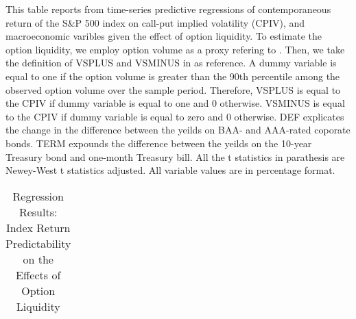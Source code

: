 \begin{table}[h]

\caption{Regression Results: Index Return Predictability on the Effects of Option Liquidity}\label{table:Volume}
\begin{threeparttable}

\medskip
\begin{spacing}{1.1}
{\scriptsize  
This table reports from time-series predictive regressions of contemporaneous return of the S\&P 500 index on call-put implied volatility (CPIV), and macroeconomic varibles given the effect of option liquidity. To estimate the option liquidity, we employ option volume as a proxy refering to \textcite{chang2018implied}. Then, we take the definition of VSPLUS and VSMINUS in \textcite{atilgan2015implied} as reference. A dummy variable is equal to one if the option volume is greater than the 90th percentile among the observed option volume over the sample period. Therefore, VSPLUS is equal to the CPIV if dummy variable is equal to one and 0 otherwise. VSMINUS is equal to the CPIV if dummy variable is equal to zero and 0 otherwise. DEF explicates the change in the difference between the yeilds on BAA- and AAA-rated coporate bonds. TERM expounds the difference between the yeilds on the 10-year Treasury bond and one-month Treasury bill. All the t statistics in parathesis are Newey-West t statistics adjusted. All variable values are in percentage format. 
}
\end{spacing}
\medskip
\medskip
\tiny
\centering
\begin{tabular}{ccccccccccccccc}
\toprule


\end{tabular}
\end{threeparttable}
\end{table}
